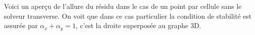 Voici un aperçu de l'allure du résidu dans le cas de un point par cellule sans le solveur transverse. On voit que dans ce cas particulier la condition de stabilité est assurée par $\alpha_x + \alpha_y =1 $, c'est la droite superposée au graphe 3D.


